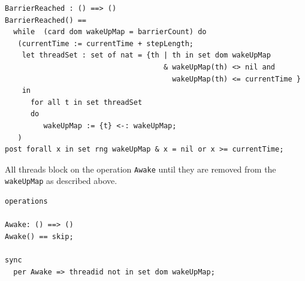 \documentclass{overturerepchap}
\begin{document}
\begin{lstlisting}
BarrierReached : () ==> ()
BarrierReached() == 
  while  (card dom wakeUpMap = barrierCount) do
   (currentTime := currentTime + stepLength;
    let threadSet : set of nat = {th | th in set dom wakeUpMap 
                                     & wakeUpMap(th) <> nil and 
                                       wakeUpMap(th) <= currentTime }
    in
      for all t in set threadSet 
      do
         wakeUpMap := {t} <-: wakeUpMap;
   )
post forall x in set rng wakeUpMap & x = nil or x >= currentTime;
\end{lstlisting}

All threads block on the operation \texttt{Awake} until they are removed from
the \texttt{wakeUpMap} as described above.

\begin{lstlisting}
operations

Awake: () ==> ()
Awake() == skip;

sync
  per Awake => threadid not in set dom wakeUpMap;
\end{lstlisting}

%

%

%
%
%
\end{document}
